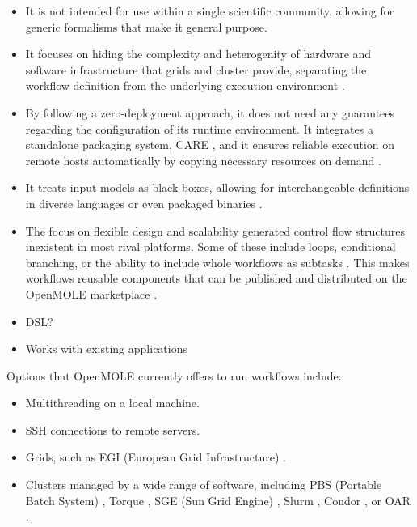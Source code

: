 \documentclass[11pt,a4paper]{report}
\begin{document}
\begin{itemize}
	\item It is not intended for use within a single scientific community, allowing for generic formalisms that make it general purpose.
	\item It focuses on hiding the complexity and heterogenity of hardware and software infrastructure that grids and cluster provide, separating the workflow definition from the underlying execution environment \cite{Reuillon2010}.
	\item By following a zero-deployment approach, it does not need any guarantees regarding the configuration of its runtime environment. It integrates a standalone packaging system, CARE \cite{Janin.etal.2014}, and it ensures reliable execution on remote hosts automatically by copying necessary resources on demand \cite{Reuillon2015}.
	\item It treats input models as black-boxes, allowing for interchangeable definitions in diverse languages or even packaged binaries \cite{Reuillon2013}.
	\item The focus on flexible design and scalability generated control flow structures inexistent in most rival platforms. Some of these include loops, conditional branching, or the ability to include whole workflows as subtasks \cite{Reuillon2013}. This makes workflows reusable components that can be published and distributed on the OpenMOLE marketplace \cite{OpenMOLEMarketplace}.
	\item DSL? 
	\item Works with existing applications 
\end{itemize}


Options that OpenMOLE currently offers to run workflows include:

\begin{itemize}
	\item Multithreading on a local machine.
	\item SSH connections to remote servers.
	\item Grids, such as EGI (European Grid Infrastructure) \cite{EGI}.
	\item Clusters managed by a wide range of software, including PBS (Portable Batch System) \cite{PBS}, Torque \cite{Torque}, SGE (Sun Grid Engine) \cite{SGE}, Slurm \cite{SLURM}, Condor \cite{HTCondor}, or OAR \cite{OAR}.
\end{itemize}
\end{document}
